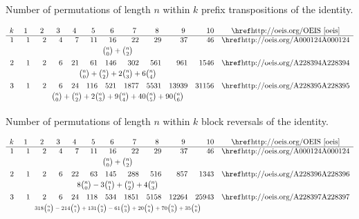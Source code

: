     \begin{table}[t]
    \caption{Number of permutations of length $n$ within $k$ prefix transpositions of the 
    identity.}
    \begin{footnotesize}
    $$
    \begin{array}{rrrrrrrrrrrc}
    k &\ 1\ &\ 2\ &\ 3\ &\ 4\ &\ 5\ &\ 6\ &\ 7\ &\ 8\ &\ 9\
    &10&\text{\OEISref}\\\hline 1& 1& 2& 4& 7& 11& 16& 22& 29& 37&
    46& \text{\OEISlink{A000124}}\\[0.5ex]
    &\multicolumn{10}{c}{\nc0 + \nc2  }&\\[1ex]
    2& 1& 2& 6& 21& 61& 146& 302& 561& 961& 1546& \text{\OEISlink{A228394}}\\[0.5ex]
    &\multicolumn{10}{c}{\nc0 + \nc2  + 2\nc3 + 6\nc4 }&\\[1ex]
    3& 1& 2& 6& 24& 116& 521& 1877& 5531& 13939&
    31156&\text{\OEISlink{A228395}}\\[0.5ex]
    &\multicolumn{10}{c}{\nc0 + \nc2 + 2\nc3 + 9\nc4 + 40\nc5 + 90\nc6
    }&\\[1ex]
    \end{array}
    $$
    \end{footnotesize}
    \end{table}
  
    \begin{table}[t]
    \caption{Number of permutations of length $n$ within $k$ block reversals of the
    identity.}
    \begin{footnotesize}
    $$
    \begin{array}{rrrrrrrrrrrc}
    k &\ 1\ &\ 2\ &\ 3\ &\ 4\ &\ 5\ &\ 6\ &\ 7\ &\ 8\ &\ 9\
    &10&\text{\OEISref}\\\hline
    1&1&2&4&7&11&16&22&29&37&46&\text{\OEISlink{A000124}}\\[0.5ex]
    &\multicolumn{10}{c}{{n\choose 0}+{n\choose 2}}&\\[1ex]
    2&1&2&6&22&63&145&288&516&857&1343&\text{\OEISlink{A228396}}\\[0.5ex]
    &\multicolumn{10}{c}{8{n\choose 0}-3{n\choose 1}+{n\choose 2}+4{n\choose 3}}&\\[1ex]
    3&1&2&6&24&118&534&1851&5158&12264&25943&\text{\OEISlink{A228397}}\\[0.5ex]
    &\multicolumn{10}{c}{\text{ \scriptsize $318\nc0 -214\nc1 +131\nc2 -61\nc3
    +20\nc4 +70\nc5 +35\nc6$  }}&\\[1ex]\end{array}
    $$
    \end{footnotesize}
    \end{table}
  
